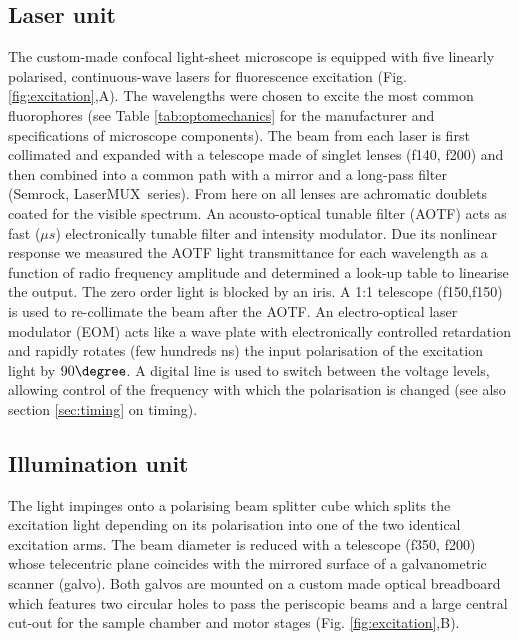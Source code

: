 \documentclass[12pt]{spieman}  %
\begin{document}
\begin{spacing}{2}
\subsection{Laser unit}		
The custom-made confocal light-sheet microscope is equipped with five linearly polarised, continuous-wave lasers for fluorescence excitation (Fig. \ref{fig:excitation},A). The wavelengths were chosen to excite the most common fluorophores (see Table \ref{tab:optomechanics} for the manufacturer and specifications of microscope components). The beam from each laser is first collimated and expanded with a telescope made of singlet lenses (f140, f200) and then combined into a common path with a mirror and a long-pass filter (Semrock, LaserMUX\texttrademark\ series). From here on all lenses are achromatic doublets coated for the visible spectrum. An acousto-optical tunable filter (AOTF) acts as fast ($\mu s$) electronically tunable filter and intensity modulator. Due its nonlinear response we measured the AOTF light transmittance for each wavelength as a function of radio frequency amplitude and determined a look-up table to linearise the output. The zero order light is blocked by an iris. A 1:1 telescope (f150,f150) is used to re-collimate the beam after the AOTF. An electro-optical laser modulator (EOM) acts like a wave plate with electronically controlled retardation and rapidly rotates (few hundreds ns) the input polarisation of the excitation light by $90\degree$. A digital line is used to switch between the voltage levels, allowing control of the frequency with which the polarisation is changed (see also section \ref{sec:timing} on timing).

\subsection{Illumination unit}		
The light impinges onto a polarising beam splitter cube which splits the excitation light depending on its polarisation into one of the two identical excitation arms. The beam diameter is reduced with a telescope (f350, f200) whose telecentric plane coincides with the mirrored surface of a galvanometric scanner (galvo). Both galvos are mounted on a custom made optical breadboard which features two circular holes to pass the periscopic beams and a large central cut-out for the sample chamber and motor stages (Fig. \ref{fig:excitation},B). 


\end{spacing}
\end{document}
